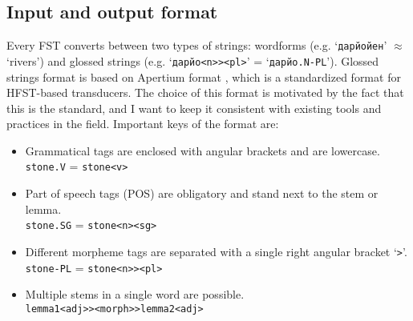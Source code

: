 \subsection{Input and output format}
Every FST converts between two types of strings: wordforms (e.g. `\texttt{дарйойен}' $\approx$ `rivers') and glossed strings (e.g. `\texttt{дарйо<n>><pl>}' = `\texttt{дарйо.N-PL}'). Glossed strings format is based on Apertium format , which is a standardized format for HFST-based transducers. The choice of this format is motivated by the fact that this is the standard, and I want to keep it consistent with existing tools and practices in the field. Important keys of the format are:


\begin{itemize}
    \item Grammatical tags are enclosed with angular brackets and are lowercase.\\
    \texttt{stone.V} = \texttt{stone<v>}
    \item Part of speech tags (POS) are obligatory and stand next to the stem or lemma.\\
    \texttt{stone.SG} = \texttt{stone<n><sg>}
    \item Different morpheme tags are separated with a single right angular bracket `\texttt{>}'.\\
    \texttt{stone-PL} = \texttt{stone<n>><pl>}
    \item Multiple stems in a single word are possible.\\
    \texttt{lemma1<adj>><morph>>lemma2<adj>}
\end{itemize}

